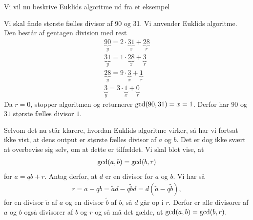 Vi vil nu beskrive Euklids algoritme ud fra et eksempel 
\begin{exa}\label{exa:euklid}
Vi skal finde største fælles divisor af 90 og 31. Vi anvender Euklids algoritme. Den består af gentagen division med rest
\begin{align*}
\underbrace{90}_{y} = 2 \cdot \underbrace{31}_{x} + \underbrace{28}_{r} \\
\underbrace{31}_{y} = 1 \cdot \underbrace{28}_{x} + \underbrace{3}_{r} \\
\underbrace{28}_{y} = 9 \cdot \underbrace{3}_{x} + \underbrace{1}_{r} \\
\underbrace{3}_{y} = 3 \cdot \underbrace{1}_{x} + \underbrace{0}_{r} 
\end{align*}
Da $r=0$, stopper algoritmen og returnerer $\textnormal{gcd}(90,31) = x = 1$. Derfor har $90$ og $31$ største fælles divisor $1$. 
\end{exa}
Selvom det nu står klarere, hvordan Euklids algoritme virker, så har vi fortsat ikke vist, at dens output er største fælles divisor af $a$ og $b$. Det er dog ikke svært at overbevise sig selv, om at dette er tilfældet. Vi skal blot vise, at 
\begin{align*}
\textnormal{gcd}(a,b) = \textnormal{gcd}(b,r)
\end{align*}
for $a = qb + r$. Antag derfor, at $d$ er en divisor for $a$ og $b$. Vi har så
\begin{align*}
r = a-qb = \tilde{a}d - q\tilde{b}d = d(\tilde{a}-q\tilde{b}),
\end{align*}
for en divisor $\tilde{a}$ af $a$ og en divisor $\tilde{b}$ af $b$, så $d$ går op i $r$. Derfor er alle divisorer af $a$ og $b$ også divisorer af $b$ og $r$ og så må det gælde, at $\textnormal{gcd}(a,b)=\textnormal{gcd}(b,r)$.

